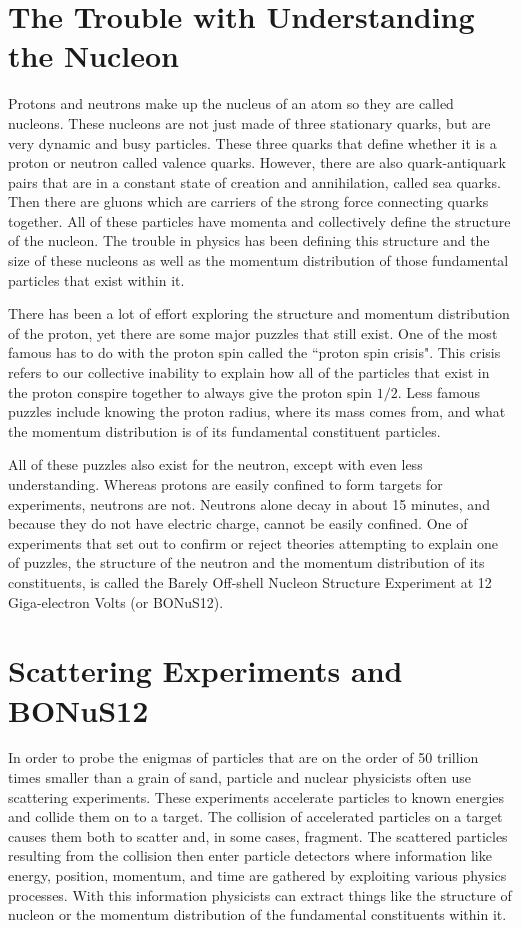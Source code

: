 \section{The Trouble with Understanding the Nucleon}
Protons and neutrons make up the nucleus of an atom so they are called nucleons. These nucleons are not just made of three stationary quarks, but are very dynamic and busy particles. These three quarks that define whether it is a proton or neutron called valence quarks. However, there are also quark-antiquark pairs that are in a constant state of creation and annihilation, called sea quarks. Then there are gluons which are carriers of the strong force connecting quarks together. All of these particles have momenta and collectively define the structure of the nucleon. The trouble in physics has been defining this structure and the size of these nucleons as well as the momentum distribution of those fundamental particles that exist within it.

There has been a lot of effort exploring the structure and momentum distribution of the proton, yet there are some major puzzles that still exist. One of the most famous has to do with the proton spin called the ``proton spin crisis". This crisis refers to our collective inability to explain how all of the particles that exist in the proton conspire together to always give the proton spin $1/2$. Less famous puzzles include knowing the proton radius, where its mass comes from, and what the momentum distribution is of its fundamental constituent particles.

All of these puzzles also exist for the neutron, except with even less understanding. Whereas protons are easily confined to form targets for experiments, neutrons are not. Neutrons alone decay in about 15 minutes, and because they do not have electric charge, cannot be easily confined. One of experiments that set out to confirm or reject theories attempting to explain one of puzzles, the structure of the neutron and the momentum distribution of its constituents, is called the Barely Off-shell Nucleon Structure Experiment at 12 Giga-electron Volts (or BONuS12).
 
 \newpage
 \section{Scattering Experiments and BONuS12}
 In order to probe the enigmas of particles that are on the order of 50 trillion times smaller than a grain of sand, particle and nuclear physicists often use scattering experiments. These experiments accelerate particles to known energies and collide them on to a target.  The collision of accelerated particles on a target causes them both to scatter and, in some cases, fragment. The scattered particles resulting from the collision then enter particle detectors where information like energy, position, momentum, and time are gathered by exploiting various physics processes. With this information physicists can extract things like the structure of nucleon or the momentum distribution of the fundamental constituents within it.
 
